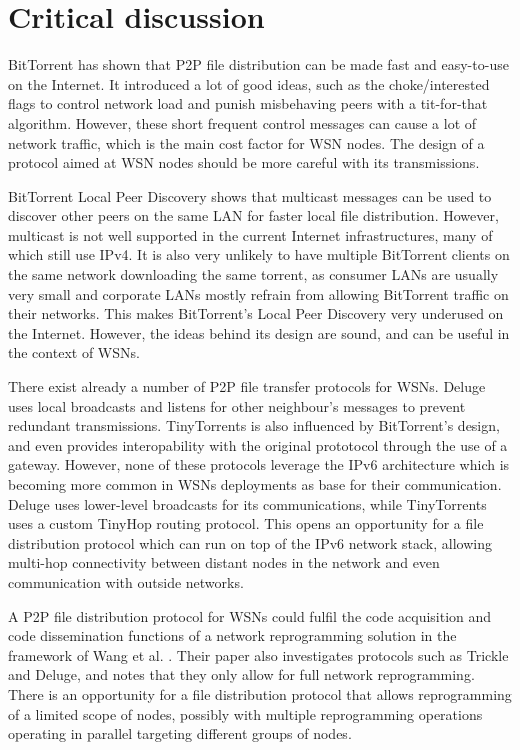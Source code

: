 \section{Critical discussion}
\label{sec:related:discussion}
BitTorrent has shown that \gls{P2P} file distribution can be made fast and easy-to-use on the Internet. It introduced a lot of good ideas, such as the choke/interested flags to control network load and punish misbehaving peers with a tit-for-that algorithm. However, these short frequent control messages can cause a lot of network traffic, which is the main cost factor for \gls{WSN} nodes. The design of a protocol aimed at \gls{WSN} nodes should be more careful with its transmissions.

BitTorrent Local Peer Discovery shows that multicast messages can be used to discover other peers on the same \gls{LAN} for faster local file distribution. However, multicast is not well supported in the current Internet infrastructures, many of which still use \gls{IPv4}. It is also very unlikely to have multiple BitTorrent clients on the same network downloading the same torrent, as consumer \glspl{LAN} are usually very small and corporate \glspl{LAN} mostly refrain from allowing BitTorrent traffic on their networks. This makes BitTorrent's Local Peer Discovery very underused on the Internet. However, the ideas behind its design are sound, and can be useful in the context of \glspl{WSN}.

There exist already a number of \gls{P2P} file transfer protocols for \glspl{WSN}. Deluge uses local broadcasts and listens for other neighbour's messages to prevent redundant transmissions. TinyTorrents is also influenced by BitTorrent's design, and even provides interopability with the original prototocol through the use of a gateway. However, none of these protocols leverage the \gls{IPv6} architecture which is becoming more common in \glspl{WSN} deployments as base for their communication. Deluge uses lower-level broadcasts for its communications, while TinyTorrents uses a custom TinyHop routing protocol. This opens an opportunity for a file distribution protocol which can run on top of the \gls{IPv6} network stack, allowing multi-hop connectivity between distant nodes in the network and even communication with outside networks.

A \gls{P2P} file distribution protocol for \glspl{WSN} could fulfil the code acquisition and code dissemination functions of a network reprogramming solution in the framework of Wang et al. \cite{wang-reprogramming}. Their paper also investigates protocols such as Trickle and Deluge, and notes that they only allow for full network reprogramming. There is an opportunity for a file distribution protocol that allows reprogramming of a limited scope of nodes, possibly with multiple reprogramming operations operating in parallel targeting different groups of nodes.
